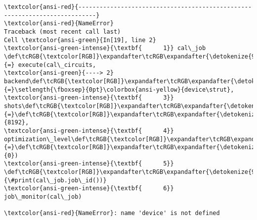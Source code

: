 \documentclass[11pt]{article}
\begin{document}
    \begin{Verbatim}[commandchars=\\\{\}, frame=single, framerule=2mm, rulecolor=\color{outerrorbackground}]
\textcolor{ansi-red}{---------------------------------------------------------------------------}
\textcolor{ansi-red}{NameError}                                 Traceback (most recent call last)
Cell \textcolor{ansi-green}{In[19], line 2}
\textcolor{ansi-green-intense}{\textbf{      1}} cal\_job \def\tcRGB{\textcolor[RGB]}\expandafter\tcRGB\expandafter{\detokenize{98,98,98}}{=} execute(cal\_circuits,
\textcolor{ansi-green}{----> 2}              backend\def\tcRGB{\textcolor[RGB]}\expandafter\tcRGB\expandafter{\detokenize{98,98,98}}{=}\setlength{\fboxsep}{0pt}\colorbox{ansi-yellow}{device\strut},
\textcolor{ansi-green-intense}{\textbf{      3}}              shots\def\tcRGB{\textcolor[RGB]}\expandafter\tcRGB\expandafter{\detokenize{98,98,98}}{=}\def\tcRGB{\textcolor[RGB]}\expandafter\tcRGB\expandafter{\detokenize{98,98,98}}{8192},
\textcolor{ansi-green-intense}{\textbf{      4}}              optimization\_level\def\tcRGB{\textcolor[RGB]}\expandafter\tcRGB\expandafter{\detokenize{98,98,98}}{=}\def\tcRGB{\textcolor[RGB]}\expandafter\tcRGB\expandafter{\detokenize{98,98,98}}{0})
\textcolor{ansi-green-intense}{\textbf{      5}} \def\tcRGB{\textcolor[RGB]}\expandafter\tcRGB\expandafter{\detokenize{95,135,135}}{\#print(cal\_job.job\_id())}
\textcolor{ansi-green-intense}{\textbf{      6}} job\_monitor(cal\_job)

\textcolor{ansi-red}{NameError}: name 'device' is not defined
    \end{Verbatim}
\end{document}

